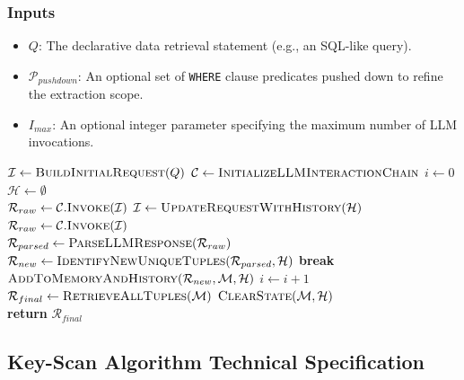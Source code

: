 \subsubsection{Inputs}
\begin{itemize}
    \item $Q$: The declarative data retrieval statement (e.g., an SQL-like query).
    \item $\mathcal{P}_{pushdown}$: An optional set of \texttt{WHERE} clause predicates pushed down to refine the extraction scope.
    \item $I_{max}$: An optional integer parameter specifying the maximum number of LLM invocations.
\end{itemize}

\begin{algorithm}
\caption{Table-Scan Algorithm}
\label{alg:table_scan}
\begin{algorithmic}[1]
    \State $\mathcal{I} \gets \Call{BuildInitialRequest}{Q}$ 
    \State $\mathcal{C} \gets \Call{InitializeLLMInteractionChain}{}$
    \State $i \gets 0$
    \State $\mathcal{H} \gets \emptyset$ 
    \\
            \State $\mathcal{R}_{raw} \gets \mathcal{C}.\Call{Invoke}{\mathcal{I}}$
        \Else
            \State $\mathcal{I} \gets \Call{UpdateRequestWithHistory}{\mathcal{H}}$
            \State $\mathcal{R}_{raw} \gets \mathcal{C}.\Call{Invoke}{\mathcal{I}}$
        \EndIf
        \\  
        \State $\mathcal{R}_{parsed} \gets \Call{ParseLLMResponse}{\mathcal{R}_{raw}}$
        \State $\mathcal{R}_{new} \gets \Call{IdentifyNewUniqueTuples}{\mathcal{R}_{parsed}, \mathcal{H}}$
            \State \textbf{break}
        \EndIf
        \\
        \State $\Call{AddToMemoryAndHistory}{\mathcal{R}_{new}, \mathcal{M}, \mathcal{H}}$
        \State $i \gets i + 1$
    \EndWhile
    \\
    \State $\mathcal{R}_{final} \gets \Call{RetrieveAllTuples}{\mathcal{M}}$
    \State $\Call{ClearState}{\mathcal{M}, \mathcal{H}}$
    \\
    \State \textbf{return} $\mathcal{R}_{final}$
\EndFunction
\end{algorithmic}
\end{algorithm}

\newpage
\subsection{Key-Scan Algorithm Technical Specification}

